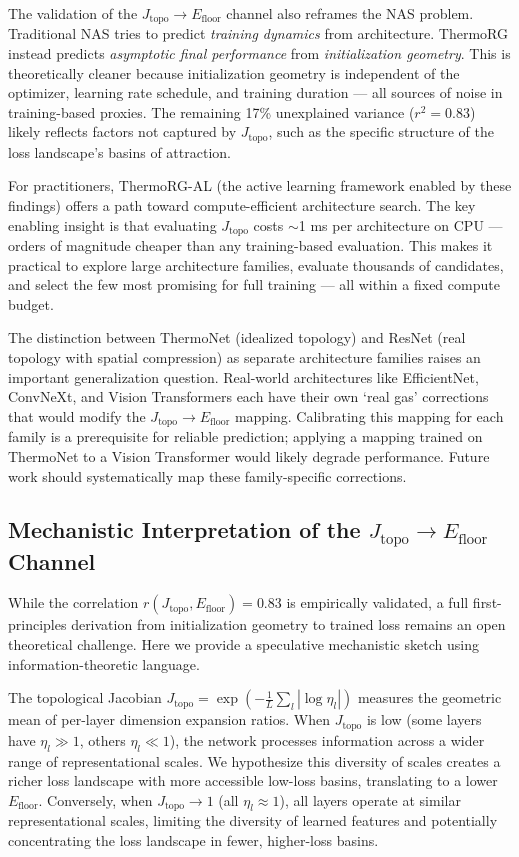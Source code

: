 \documentclass[11pt, a4paper]{article}
\theoremstyle{definition}
\begin{document}
The validation of the $J_\mathrm{topo} \to E_\mathrm{floor}$ channel also reframes the NAS problem. Traditional NAS tries to predict \emph{training dynamics} from architecture. ThermoRG instead predicts \emph{asymptotic final performance} from \emph{initialization geometry}. This is theoretically cleaner because initialization geometry is independent of the optimizer, learning rate schedule, and training duration — all sources of noise in training-based proxies. The remaining 17\% unexplained variance ($r^2 = 0.83$) likely reflects factors not captured by $J_\mathrm{topo}$, such as the specific structure of the loss landscape's basins of attraction.

For practitioners, ThermoRG-AL (the active learning framework enabled by these findings) offers a path toward compute-efficient architecture search. The key enabling insight is that evaluating $J_\mathrm{topo}$ costs $\sim$1 ms per architecture on CPU — orders of magnitude cheaper than any training-based evaluation. This makes it practical to explore large architecture families, evaluate thousands of candidates, and select the few most promising for full training — all within a fixed compute budget.

The distinction between ThermoNet (idealized topology) and ResNet (real topology with spatial compression) as separate architecture families raises an important generalization question. Real-world architectures like EfficientNet, ConvNeXt, and Vision Transformers each have their own `real gas' corrections that would modify the $J_\mathrm{topo} \to E_\mathrm{floor}$ mapping. Calibrating this mapping for each family is a prerequisite for reliable prediction; applying a mapping trained on ThermoNet to a Vision Transformer would likely degrade performance. Future work should systematically map these family-specific corrections.


\subsection{Mechanistic Interpretation of the $J_\mathrm{topo} \to E_\mathrm{floor}$ Channel}
\label{sec:mechanistic_interpretation}

While the correlation $r(J_\mathrm{topo}, E_\mathrm{floor}) = 0.83$ is empirically validated, a full first-principles derivation from initialization geometry to trained loss remains an open theoretical challenge. Here we provide a speculative mechanistic sketch using information-theoretic language.

The topological Jacobian $J_\mathrm{topo} = \exp(-\frac{1}{L}\sum_l|\log\eta_l|)$ measures the geometric mean of per-layer dimension expansion ratios. When $J_\mathrm{topo}$ is low (some layers have $\eta_l \gg 1$, others $\eta_l \ll 1$), the network processes information across a wider range of representational scales. We hypothesize this diversity of scales creates a richer loss landscape with more accessible low-loss basins, translating to a lower $E_\mathrm{floor}$. Conversely, when $J_\mathrm{topo} \to 1$ (all $\eta_l \approx 1$), all layers operate at similar representational scales, limiting the diversity of learned features and potentially concentrating the loss landscape in fewer, higher-loss basins.
\end{document}
